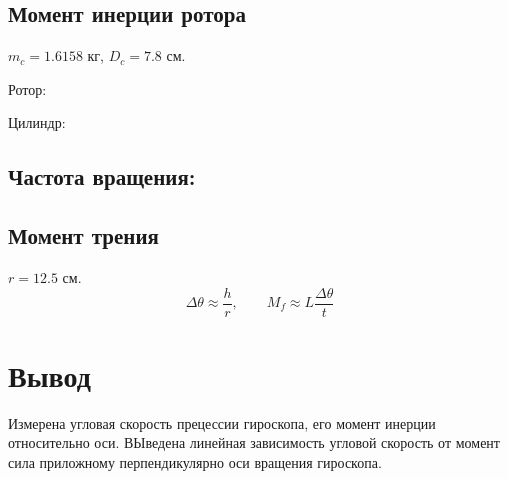 \documentclass[12pt,a4paper]{extarticle}
\begin{document}
\subsection{Момент инерции ротора}
\noindent $m_c=1.6158$ кг, $D_c=7.8$ см.

Ротор:
\begin{center}

\end{center}

Цилиндр:
\begin{center}

\end{center}




\subsection{Частота вращения:}



\subsection{Момент трения}
\noindent $r=12.5$ см.
\[
\Delta\theta\approx\frac{h}{r},\qquad M_f\approx L\frac{\Delta\theta}{t}
\]


\begin{center}

\end{center}

\section{Вывод}

Измерена угловая скорость прецессии гироскопа, его момент инерции относительно оси. 
ВЫведена линейная зависимость угловой скорость от момент сила приложному 
перпендикулярно оси вращения гироскопа.
\end{document}

